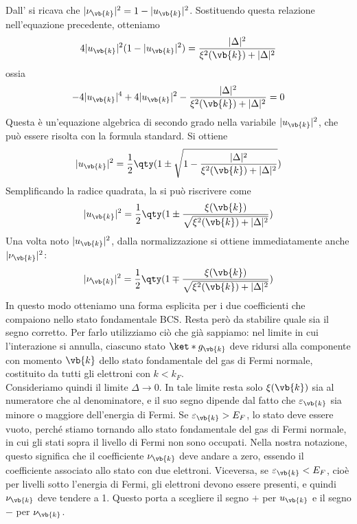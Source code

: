 Dall' si ricava che $|\nu_{\vb{k}}|^2 = 1 - |u_{\vb{k}}|^2$. Sostituendo questa relazione nell'equazione precedente, otteniamo
\begin{equation*}
   4 |u_{\vb{k}}|^2 (1 - |u_{\vb{k}}|^2)
   =\frac{|\Delta|^2}{\xi^2(\vb{k}) + |\Delta|^2}
\end{equation*}
ossia
\begin{equation*}
   -4 |u_{\vb{k}}|^4
   +4 |u_{\vb{k}}|^2
   -\frac{|\Delta|^2}{\xi^2(\vb{k}) + |\Delta|^2}
   =0
\end{equation*}
Questa è un'equazione algebrica di secondo grado nella variabile $|u_{\vb{k}}|^2$, che può essere risolta con la formula standard. Si ottiene
\begin{equation*}
   |u_{\vb{k}}|^2
   =\frac{1}{2} \qty( 1 \pm \sqrt{1 - \frac{|\Delta|^2}{\xi^2(\vb{k}) + |\Delta|^2}} )
\end{equation*}
Semplificando la radice quadrata, la si può riscrivere come
\begin{equation*}
   |u_{\vb{k}}|^2
   =\frac{1}{2} \qty( 1 \pm \frac{\xi(\vb{k})}{\sqrt{\xi^2(\vb{k}) + |\Delta|^2}} )
\end{equation*}
Una volta noto $|u_{\vb{k}}|^2$, dalla normalizzazione si ottiene immediatamente anche $|\nu_{\vb{k}}|^2$:
\begin{equation*}
   |\nu_{\vb{k}}|^2
   =\frac{1}{2} \qty( 1 \mp \frac{\xi(\vb{k})}{\sqrt{\xi^2(\vb{k}) + |\Delta|^2}} )
\end{equation*}
In questo modo otteniamo una forma esplicita per i due coefficienti che compaiono nello stato fondamentale BCS. Resta però da stabilire quale sia il segno corretto. Per farlo utilizziamo ciò che già sappiamo: nel limite in cui l'interazione si annulla, ciascuno stato $\ket*{g_{\vb{k}}}$ deve ridursi alla componente con momento $\vb{k}$ dello stato fondamentale del gas di Fermi normale, costituito da tutti gli elettroni con $k < k_F$.\\
Consideriamo quindi il limite $\Delta \to 0$. In tale limite resta solo $\xi(\vb{k})$ sia al numeratore che al denominatore, e il suo segno dipende dal fatto che $\varepsilon_{\vb{k}}$ sia minore o maggiore dell'energia di Fermi. Se $\varepsilon_{\vb{k}}>E_F$, lo stato deve essere vuoto, perché stiamo tornando allo stato fondamentale del gas di Fermi normale, in cui gli stati sopra il livello di Fermi non sono occupati. Nella nostra notazione, questo significa che il coefficiente $\nu_{\vb{k}}$ deve andare a zero, essendo il coefficiente associato allo stato con due elettroni. Viceversa, se $\varepsilon_{\vb{k}}<E_F$, cioè per livelli sotto l'energia di Fermi, gli elettroni devono essere presenti, e quindi $\nu_{\vb{k}}$ deve tendere a 1. Questo porta a scegliere il segno $+$ per $u_{\vb{k}}$ e il segno $-$ per $\nu_{\vb{k}}$.\\
